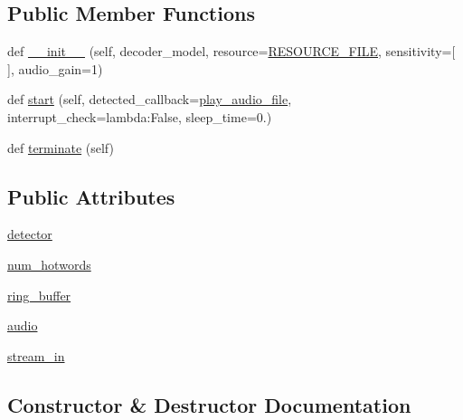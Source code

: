 \subsection*{Public Member Functions}
\begin{DoxyCompactItemize}
\item 
def \hyperlink{classsnowboydecoder_1_1HotwordDetector_a22091f02a8fea2f6065f8bc45addf7fc}{\+\_\+\+\_\+init\+\_\+\+\_\+} (self, decoder\+\_\+model, resource=\hyperlink{namespacesnowboydecoder_ae9aa648d909800942df02cc34b56b83a}{R\+E\+S\+O\+U\+R\+C\+E\+\_\+\+F\+I\+LE}, sensitivity=\mbox{[}$\,$\mbox{]}, audio\+\_\+gain=1)
\item 
def \hyperlink{classsnowboydecoder_1_1HotwordDetector_a0b753c51c1a02be091a7673870cd74e6}{start} (self, detected\+\_\+callback=\hyperlink{namespacesnowboydecoder_a828506a06fcca3526430747208f904aa}{play\+\_\+audio\+\_\+file}, interrupt\+\_\+check=lambda\+:\+False, sleep\+\_\+time=0.)
\item 
def \hyperlink{classsnowboydecoder_1_1HotwordDetector_a1ab6e303be1e4dbd5adaa9b9d29dfa1a}{terminate} (self)
\end{DoxyCompactItemize}
\subsection*{Public Attributes}
\begin{DoxyCompactItemize}
\item 
\hyperlink{classsnowboydecoder_1_1HotwordDetector_a443f1b4a74ff9e6dab682d9161b7aa52}{detector}
\item 
\hyperlink{classsnowboydecoder_1_1HotwordDetector_a45759e8fb8047abaf3697071cb88364c}{num\+\_\+hotwords}
\item 
\hyperlink{classsnowboydecoder_1_1HotwordDetector_ae5f5881d045e26f9e750b5e03c99f29c}{ring\+\_\+buffer}
\item 
\hyperlink{classsnowboydecoder_1_1HotwordDetector_a747f6301374f25541183bd2b7f0baac6}{audio}
\item 
\hyperlink{classsnowboydecoder_1_1HotwordDetector_a2658be70bb0b1939517e24f008d392a2}{stream\+\_\+in}
\end{DoxyCompactItemize}


\subsection{Constructor \& Destructor Documentation}
